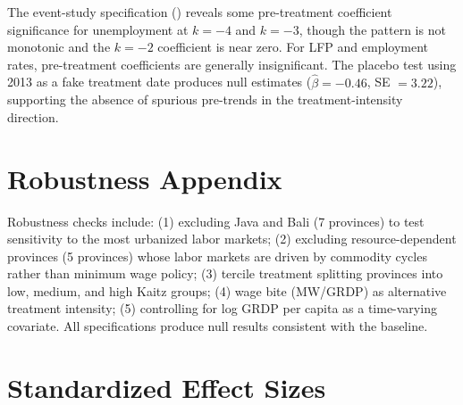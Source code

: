 \documentclass[12pt]{article}
\begin{document}
The event-study specification () reveals some pre-treatment coefficient significance for unemployment at $k = -4$ and $k = -3$, though the pattern is not monotonic and the $k = -2$ coefficient is near zero. For LFP and employment rates, pre-treatment coefficients are generally insignificant. The placebo test using 2013 as a fake treatment date produces null estimates ($\hat{\beta} = -0.46$, SE $= 3.22$), supporting the absence of spurious pre-trends in the treatment-intensity direction.

\section{Robustness Appendix}
\label{app:robustness}

Robustness checks include: (1) excluding Java and Bali (7 provinces) to test sensitivity to the most urbanized labor markets; (2) excluding resource-dependent provinces (5 provinces) whose labor markets are driven by commodity cycles rather than minimum wage policy; (3) tercile treatment splitting provinces into low, medium, and high Kaitz groups; (4) wage bite (MW/GRDP) as alternative treatment intensity; (5) controlling for log GRDP per capita as a time-varying covariate. All specifications produce null results consistent with the baseline.

\section{Standardized Effect Sizes}
\label{sec:sde}


\end{document}
